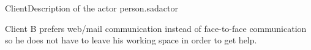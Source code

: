 
\begin{sadlist}{Client}{Description of the actor person.}{sadactor}



Client B prefers web/mail communication instead of face-to-face communication so he does not have to leave his working space in order to get help. 


\end{sadlist}